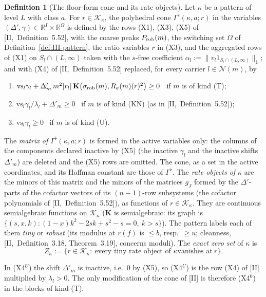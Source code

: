 \documentclass[10pt]{amsart}
\theoremstyle{definition}
\newtheorem{definition}[theorem]{Definition}
\theoremstyle{remark}
\newcommand{\R}{\mathbb R}
\begin{document}
\begin{definition}[The floor-form cone and its rate objects]\label{def:III-cone}
Let $\kappa$ be a pattern of level $L$ with class $a$.  For $r\in\mathcal
K_\kappa$, the polyhedral cone $\Gamma^\flat(\kappa,a;r)$ in the variables
$(\Delta',\gamma)\in\R^I\times\R^\Omega$ is defined by the rows (X1), (X3),
(X5) of [II,~Definition~5.52], with the coarse peaks $P_{\rm rob}(m)$, the
switching set $\Omega$ of Definition~\ref{def:III-pattern}, the ratio
variables $r$ in (X3), and the aggregated rows of (X1) on $S_l\cap(L,\infty)$
taken with the $s$-free coefficient $\alpha_l:=\|v_l1_{S_l\cap(L,\infty)}\|_1$;
and with (X4) of [II,~Definition~5.52] replaced, for every carrier $l\in
\mathcal N(m)$, by
\begin{enumerate}
\item[(X4$^0$)] $\mathrm{vs}_l\gamma_l+\Delta'_m\,m^2|r_l|\,\mathbf K\big(
\sigma_{\rm rob}(m),R_a(m)(r)^2\big)\ge0$ \ if $m$ is of kind (T);
\item[(X4)] $\mathrm{vs}_l\gamma_l/\lambda_l+\Delta'_m\ge0$ \ if $m$ is of kind
(KN) (as in [II,~Definition~5.52]);
\item[(X4$^U$)] $\mathrm{vs}_l\gamma_l\ge0$ \ if $m$ is of kind (U).
\end{enumerate}
The \emph{matrix of $\Gamma^\flat(\kappa,a;r)$} is formed in the active
variables only: the columns of the components declared inactive by (X5)
(the inactive $\gamma_l$ and the inactive shifts $\Delta'_m$) are deleted
and the (X5) rows are omitted.  The cone, as a set in the active
coordinates, and its Hoffman constant are those of $\Gamma^\flat$.  The
\emph{rate objects of $\kappa$} are the minors of this matrix and the
minors of the matrices $g_J$ formed by the
$\Delta'$-parts of the cofactor vectors of its $(n-1)$-row subsystems
\textup{(}the cofactor polynomials of [II,~Definition~5.52]\textup{)}, as functions
of $r\in\mathcal K_\kappa$.  They are continuous semialgebraic functions on
$\mathcal K_\kappa$ ($\mathbf K$ is semialgebraic: its graph is $\{(s,x,k):
(1-x)k^2-2sk+s^2-s=0,\ k>s\}$).  The pattern labels each of them
\emph{tiny} or \emph{robust} (its modulus at $r(f)$ is $\le b$, resp.\
$\ge u$; cleanness, [II,~Definition~3.18, Theorem~3.19], concerns moduli).
The \emph{exact zero set} of $\kappa$ is
\[
 Z_\kappa:=\{r\in\mathcal K_\kappa:\ \text{every tiny rate object of $\kappa$
 vanishes at}\ r\}.
\]
\end{definition}

In (X4$^U$) the shift $\Delta'_m$ is inactive, i.e.\ $0$ by (X5), so (X4$^U$) is the row (X4)
of [II] multiplied by $\lambda_l>0$.  The only modification of the cone of
[II] is therefore (X4$^0$) in the blocks of kind (T).
\end{document}
